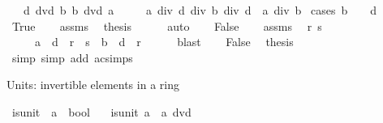 \begin{isabellebody}
\ \ \ {\isachardoublequoteopen}d\ dvd\ b{\isachardoublequoteclose}\ {\isachardoublequoteopen}b\ dvd\ a{\isachardoublequoteclose}\isanewline
\ \ \ \ \ {\isachardoublequoteopen}{\isacharparenleft}{\kern0pt}a\ div\ d{\isacharparenright}{\kern0pt}\ div\ {\isacharparenleft}{\kern0pt}b\ div\ d{\isacharparenright}{\kern0pt}\ {\isacharequal}{\kern0pt}\ a\ div\ b{\isachardoublequoteclose}\isanewline
%
\isadelimproof
%
\endisadelimproof
%
\isatagproof
{}\isamarkupfalse%
\ {\isacharparenleft}{\kern0pt}cases\ {\isachardoublequoteopen}b\ {\isacharequal}{\kern0pt}\ {}\ {\isasymor}\ d\ {\isacharequal}{\kern0pt}\ {}{\isachardoublequoteclose}{\isacharparenright}{\kern0pt}\isanewline
\ \ \isamarkupfalse%
\ True\isanewline
\ \ \isamarkupfalse%
\ assms\ \isamarkupfalse%
\ {\isacharquery}{\kern0pt}thesis\isanewline
\ \ \ \ \isamarkupfalse%
\ auto\isanewline
{}\isamarkupfalse%
\isanewline
\ \ \isamarkupfalse%
\ False\isanewline
\ \ \isamarkupfalse%
\ assms\ \isamarkupfalse%
\ r\ s\isanewline
\ \ \ \ \ {\isachardoublequoteopen}a\ {\isacharequal}{\kern0pt}\ d\ {\isacharasterisk}{\kern0pt}\ r\ {\isacharasterisk}{\kern0pt}\ s{\isachardoublequoteclose}\ \ {\isachardoublequoteopen}b\ {\isacharequal}{\kern0pt}\ d\ {\isacharasterisk}{\kern0pt}\ r{\isachardoublequoteclose}\isanewline
\ \ \ \ \isamarkupfalse%
\ blast\isanewline
\ \ \isamarkupfalse%
\ False\ \isamarkupfalse%
\ {\isacharquery}{\kern0pt}thesis\isanewline
\ \ \ \ \isamarkupfalse%
\ simp\ {\isacharparenleft}{\kern0pt}simp\ add{\isacharcolon}{\kern0pt}\ ac{\isacharunderscore}{\kern0pt}simps{\isacharparenright}{\kern0pt}\isanewline
{}\isamarkupfalse%
%
\endisatagproof
{\isafoldproof}%
%
\isadelimproof
%
\endisadelimproof
%
\begin{isamarkuptext}%
Units: invertible elements in a ring%
\end{isamarkuptext}\isamarkuptrue%
\isamarkupfalse%
\ is{\isacharunderscore}{\kern0pt}unit\ {\isacharcolon}{\kern0pt}{\isacharcolon}{\kern0pt}\ {\isachardoublequoteopen}{\isacharprime}{\kern0pt}a\ {\isasymRightarrow}\ bool{\isachardoublequoteclose}\isanewline
\ \ \ {\isachardoublequoteopen}is{\isacharunderscore}{\kern0pt}unit\ a\ {\isasymequiv}\ a\ dvd\ {}{\isachardoublequoteclose}\isanewline
\isanewline

\end{isabellebody}
